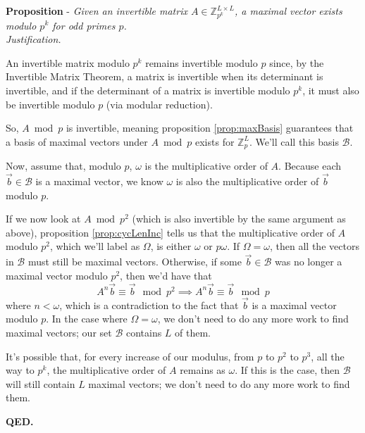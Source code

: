 \documentclass[a4paper, 12pt, reqno]{amsart}
\newcounter{propcounter}
\newenvironment{proposition}[1]
{
	\refstepcounter{propcounter}
	\textbf{Proposition \thepropcounter} - \emph{#1} \\
	\emph{Justification.}
}
{
	\textbf{QED.} \\
}
\begin{document}
		\begin{proposition}{Given an invertible matrix $A \in \mathds{Z}_{p^k}^{L \times L}$, a maximal vector exists modulo $p^k$ for odd primes $p$.}
			\label{prop:maxVectGuarantee}
			An invertible matrix modulo $p^k$ remains invertible modulo $p$ since, by the Invertible Matrix Theorem, a matrix is invertible when its determinant is 
			invertible, and if the determinant of a matrix is invertible modulo $p^k$, it must also be invertible modulo $p$ (via modular reduction).
			
			So, $A \bmod{p}$ is invertible, meaning proposition \ref{prop:maxBasis} guarantees that a basis of maximal vectors under $A \bmod{p}$ exists for $\mathds{Z}_p^L$.
			We'll call this basis $\mathcal{B}$.
			
			Now, assume that, modulo $p$, $\omega$ is the multiplicative order of $A$. Because each $\vec{b} \in \mathcal{B}$ is a maximal vector, we know $\omega$ is also 
			the multiplicative order of $\vec{b}$ modulo $p$.
			
			If we now look at $A \bmod{p^2}$ (which is also invertible by the same argument as above), proposition \ref{prop:cycLenInc} tells us that the multiplicative order
			of $A$ modulo $p^2$, which we'll label as $\Omega$, is either $\omega$ or $p\omega$. If $\Omega = \omega$, then all the vectors in $\mathcal{B}$ must still be 
			maximal vectors. Otherwise, if some $\vec{b} \in \mathcal{B}$ was no longer a maximal vector modulo $p^2$, then we'd have that
			\[
				A^n\vec{b} \equiv \vec{b} \mod{p^2} \implies A^n\vec{b} \equiv \vec{b} \mod{p}
			\]
			where $n < \omega$, which is a contradiction to the fact that $\vec{b}$ is a maximal vector modulo $p$. In the case where $\Omega = \omega$, we don't need to do
			any more work to find maximal vectors; our set $\mathcal{B}$ contains $L$ of them.
			
			It's possible that, for every increase of our modulus, from $p$ to $p^2$ to $p^3$, all the way to $p^k$, the multiplicative order of $A$ remains as $\omega$. If 
			this is the case, then $\mathcal{B}$ will still contain $L$ maximal vectors; we don't need to do any more work to find them.
			

\end{proposition}
\end{document}
